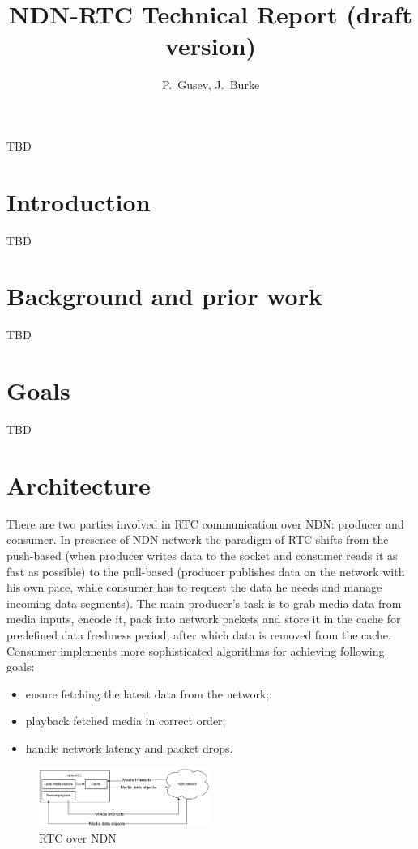 \documentclass[10pt]{proc}
\author{P.~Gusev, J.~Burke}
\title{NDN-RTC Technical Report (draft version)}
\begin{document}
\maketitle

\abstract
TBD

\section{Introduction}
TBD

\section{Background and prior work}
TBD

\section{Goals}
TBD

\section{Architecture}
There are two parties involved in RTC communication over NDN: producer and consumer. In presence of NDN network the paradigm of RTC shifts from the push-based (when producer writes data to the socket and consumer reads it as fast as possible) to the pull-based (producer publishes data on the network with his own pace, while consumer has to request the data he needs and manage incoming data segments).
The main producer's task is to grab media data from media inputs, encode it, pack into network packets and store it in the cache for predefined data freshness period, after which data is removed from the cache.
Consumer implements more sophisticated algorithms for achieving following goals:
\begin{itemize}
\item ensure fetching the latest data from the network; 
\item playback fetched media in correct order;
\item handle network latency and packet drops.
\end{itemize}

\begin{figure}[Ht!]
\centering
\includegraphics[width=0.5\textwidth]{architecture}
\caption{RTC over NDN}
\label{fig:arc}
\end{figure}
\end{document}
